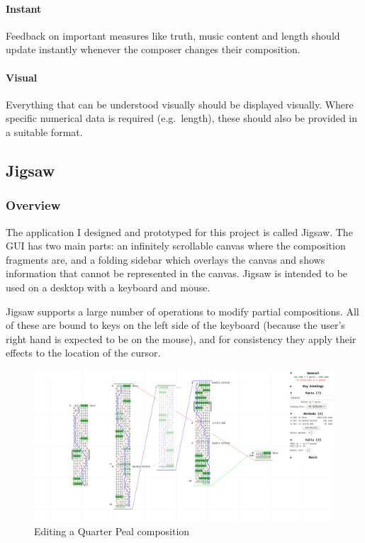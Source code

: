 \documentclass[12pt]{article}
\begin{document}
\paragraph{Instant} Feedback on important measures like truth, music content and length should
update instantly whenever the composer changes their composition.  

\paragraph{Visual} Everything that can be understood visually should be displayed visually.  Where
specific numerical data is required (e.g.\ length), these should also be provided in a suitable
format.

\subsection{Jigsaw}

\subsubsection{Overview}

The application I designed and prototyped for this project is called Jigsaw.  The GUI has two main
parts: an infinitely scrollable canvas where the composition fragments are, and a folding sidebar
which overlays the canvas and shows information that cannot be represented in the canvas.  Jigsaw is
intended to be used on a desktop with a keyboard and mouse.

Jigsaw supports a large number of operations to modify partial compositions.  All of these are bound
to keys on the left side of the keyboard (because the user's right hand is expected to be on the
mouse), and for consistency they apply their effects to the location of the cursor.

\begin{figure}
    \centering
    \includegraphics[width=\textwidth]{false-qp}
    \caption{Editing a Quarter Peal composition}\label{fig:cur-screenshot}
\end{figure}
\end{document}

